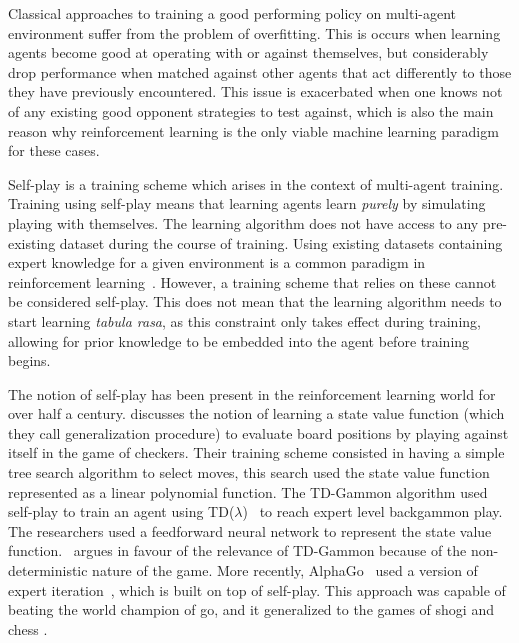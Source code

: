 \documentclass{../main.tex}{}
\begin{document}
Classical approaches to training a good performing policy on multi-agent environment suffer from the problem of overfitting. This is occurs when learning agents become good at operating with or against themselves, but considerably drop performance when matched against other agents that act differently to those they have previously encountered. This issue is exacerbated when one knows not of any existing good opponent strategies to test against, which is also the main reason why reinforcement learning is the only viable machine learning paradigm for these cases.

Self-play is a training scheme which arises in the context of multi-agent training. Training using self-play means that learning agents learn \textit{purely} by simulating playing with themselves. The learning algorithm does not have access to any pre-existing dataset during the course of training. Using existing datasets containing expert knowledge for a given environment is a common paradigm in reinforcement learning~\citep{silver2016mastering}. However, a training scheme that relies on these cannot be considered self-play. This does not mean that the learning algorithm needs to start learning \textit{tabula rasa}, as this constraint only takes effect during training, allowing for prior knowledge to be embedded into the agent before training begins.

The notion of self-play has been present in the reinforcement learning world for over half a century. \citep{Samuel1959} discusses the notion of learning a state value function (which they call generalization procedure) to evaluate board positions by playing against itself in the game of checkers. Their training scheme consisted in having a simple tree search algorithm to select moves, this search used the state value function represented as a linear polynomial function. The TD-Gammon algorithm \citep{TDGammon} used self-play to train an agent using TD($\lambda$)~\citep{Sutton1998} to reach expert level backgammon play. The researchers used a feedforward neural network to represent the state value function.~\citep{Tesauro1992} argues in favour of the relevance of TD-Gammon because of the non-deterministic nature of the game. More recently, AlphaGo~\citep{Silver2017a} used a version of expert iteration~\citep{Anthony2017}, which is built on top of self-play. This approach was capable of beating the world champion of go, and it generalized to the games of shogi and chess \citep{Silver2017b}. %
\end{document}
